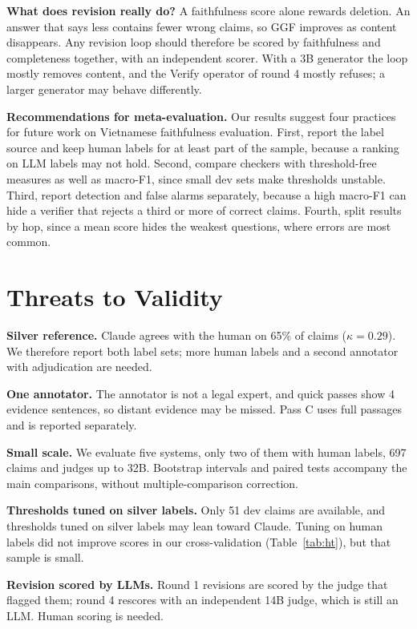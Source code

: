 \documentclass[conference]{IEEEtran}
\begin{document}
\textbf{What does revision really do?} A faithfulness score alone rewards deletion. An answer that says less contains fewer wrong claims, so GGF improves as content disappears. Any revision loop should therefore be scored by faithfulness and completeness together, with an independent scorer. With a 3B generator the loop mostly removes content, and the Verify operator of round 4 mostly refuses; a larger generator may behave differently.

\textbf{Recommendations for meta-evaluation.} Our results suggest four practices for future work on Vietnamese faithfulness evaluation. First, report the label source and keep human labels for at least part of the sample, because a ranking on LLM labels may not hold. Second, compare checkers with threshold-free measures as well as macro-F1, since small dev sets make thresholds unstable. Third, report detection and false alarms separately, because a high macro-F1 can hide a verifier that rejects a third or more of correct claims. Fourth, split results by hop, since a mean score hides the weakest questions, where errors are most common.

\section{Threats to Validity}
\textbf{Silver reference.} Claude agrees with the human on 65\% of claims ($\kappa=0.29$). We therefore report both label sets; more human labels and a second annotator with adjudication are needed.

\textbf{One annotator.} The annotator is not a legal expert, and quick passes show 4 evidence sentences, so distant evidence may be missed. Pass C uses full passages and is reported separately.

\textbf{Small scale.} We evaluate five systems, only two of them with human labels, 697 claims and judges up to 32B. Bootstrap intervals and paired tests accompany the main comparisons, without multiple-comparison correction.

\textbf{Thresholds tuned on silver labels.} Only 51 dev claims are available, and thresholds tuned on silver labels may lean toward Claude. Tuning on human labels did not improve scores in our cross-validation (Table~\ref{tab:ht}), but that sample is small.

\textbf{Revision scored by LLMs.} Round 1 revisions are scored by the judge that flagged them; round 4 rescores with an independent 14B judge, which is still an LLM. Human scoring is needed.
\end{document}

